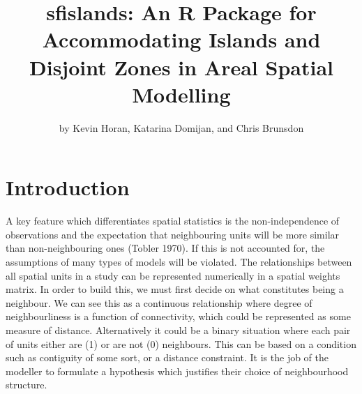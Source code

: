 \title{sfislands: An R Package for Accommodating Islands and Disjoint Zones in Areal Spatial Modelling}


\author{by Kevin Horan, Katarina Domijan, and Chris Brunsdon}

\maketitle


\hypertarget{introduction}{%
\section{Introduction}\label{introduction}}

A key feature which differentiates spatial statistics is the
non-independence of observations and the expectation that neighbouring
units will be more similar than non-neighbouring ones (Tobler 1970). If this
is not accounted for, the assumptions of many types of models will be
violated. The relationships between all spatial units in a study can be
represented numerically in a spatial weights matrix. In order to build
this, we must first decide on what constitutes being a neighbour. We can
see this as a continuous relationship where degree of neighbourliness is
a function of connectivity, which could be represented as some measure
of distance. Alternatively it could be a binary situation where each
pair of units either are (1) or are not (0) neighbours. This can be
based on a condition such as contiguity of some sort, or a distance
constraint. It is the job of the modeller to formulate a hypothesis
which justifies their choice of neighbourhood structure.

